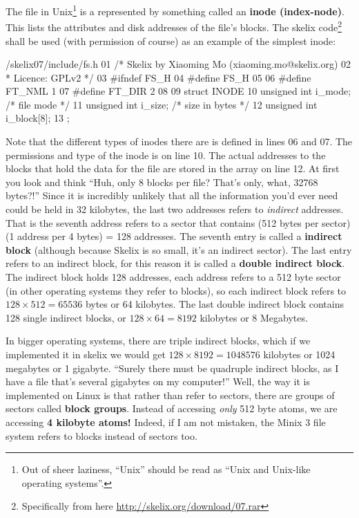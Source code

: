 The file in Unix\footnote{Out of sheer laziness, ``Unix'' should be read as ``Unix and Unix-like operating systems''.} is a represented by something called an \textbf{inode (index-node)}. This lists the attributes and disk addresses of the file's blocks. The skelix code\footnote{Specifically from here \url{http://skelix.org/download/07.rar}} shall be used (with permission of course) as an example of the simplest inode:
\begin{code}{/skelix07/include/fs.h}
01 /* Skelix by Xiaoming Mo (xiaoming.mo@skelix.org)
02  * Licence: GPLv2 */
03 #ifndef FS_H
04 #define FS_H
05 
06 #define FT_NML    1
07 #define FT_DIR    2
08
09 struct INODE {
10     unsigned int i_mode;        /* file mode */
11     unsigned int i_size;        /* size in bytes */
12     unsigned int i_block[8];
13 };
\end{code}
Note that the different types of inodes there are is defined in lines 06 and 07. The permissions and type of the inode is on line 10. The actual addresses to the blocks that hold the data for the file are stored in the array on line 12. At first you look and think ``Huh, only 8 blocks per file? That's only, what, 32768 bytes?!'' Since it is incredibly unlikely that all the information you'd ever need could be held in 32 kilobytes, the last two addresses refers to \textit{indirect} addresses. That is the seventh address refers to a sector that contains (512 bytes per sector)(1 address per 4 bytes) = 128 addresses. The seventh entry is called a \textbf{indirect block} (although because Skelix is so small, it's an indirect sector). The last entry refers to an indirect block, for this reason it is called a \textbf{double indirect block}. The indirect block holds 128 addresses, each address refers to a 512 byte sector (in other operating systems they refer to blocks), so each indirect block refers to $128\times 512 = 65536$ bytes or 64 kilobytes. The last double indirect block contains 128 single indirect blocks, or $128\times 64 = 8192$ kilobytes or 8 Megabytes.

In bigger operating systems, there are triple indirect blocks, which if we implemented it in skelix we would get $128\times 8192 = 1048576$ kilobytes or 1024 megabytes or 1 gigabyte. ``Surely there must be quadruple indirect blocks, as I have a file that's several gigabytes on my computer!'' Well, the way it is implemented on Linux is that rather than refer to sectors, there are groups of sectors called \textbf{block groups}. Instead of accessing \textit{only} 512 byte atoms, we are accessing \textbf{4 kilobyte atoms!} Indeed, if I am not mistaken, the Minix 3 file system refers to blocks instead of sectors too.

